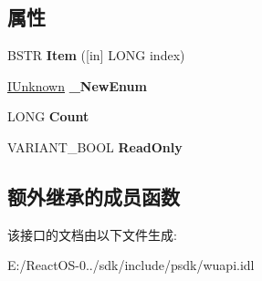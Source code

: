 \subsection*{属性}
\begin{DoxyCompactItemize}
\item 
\mbox{\label{interface_w_u_api_lib_1_1_i_string_collection_ae95574773dc83ec87f92afaf72bb31d1}} 
B\+S\+TR {\bfseries Item} (\mbox{[}in\mbox{]} L\+O\+NG index)
\item 
\mbox{\label{interface_w_u_api_lib_1_1_i_string_collection_a5ccf52021f1e285a3d076e496f1d0ecb}} 
\hyperlink{interface_i_unknown}{I\+Unknown} {\bfseries \+\_\+\+New\+Enum}
\item 
\mbox{\label{interface_w_u_api_lib_1_1_i_string_collection_a6e73bb3a0e566654a4a8f209c87670a4}} 
L\+O\+NG {\bfseries Count}
\item 
\mbox{\label{interface_w_u_api_lib_1_1_i_string_collection_a11becc16a89d692b7c7faed9e02eea30}} 
V\+A\+R\+I\+A\+N\+T\+\_\+\+B\+O\+OL {\bfseries Read\+Only}
\end{DoxyCompactItemize}
\subsection*{额外继承的成员函数}


该接口的文档由以下文件生成\+:\begin{DoxyCompactItemize}
\item 
E\+:/\+React\+O\+S-\/0../sdk/include/psdk/wuapi.\+idl\end{DoxyCompactItemize}
